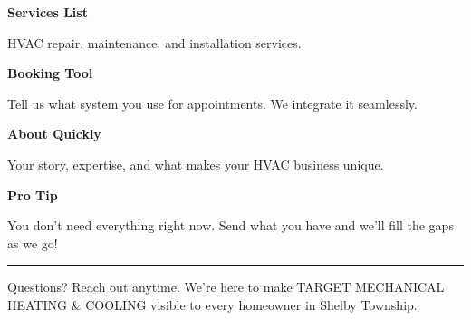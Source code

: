 \documentclass[11pt,letterpaper]{article}
\begin{document}
\begin{minipage}[t]{0.48\textwidth}
\begin{tcolorbox}[colframe=accent-teal, boxrule=1pt, left=0.7em, right=0.7em, top=0.5em, bottom=0.5em, arc=4pt, boxsep=0pt]
{\bfseries\small\color{accent-teal}Services List}

\vspace{0.15em}

{\small HVAC repair, maintenance, and installation services.}
\end{tcolorbox}

\vspace{0.1em}

\begin{tcolorbox}[colframe=accent-teal, boxrule=1pt, left=0.7em, right=0.7em, top=0.5em, bottom=0.5em, arc=4pt, boxsep=0pt]
{\bfseries\small\color{accent-teal}Booking Tool}

\vspace{0.15em}

{\small Tell us what system you use for appointments. We integrate it seamlessly.}
\end{tcolorbox}

\vspace{0.1em}

\begin{tcolorbox}[colframe=accent-teal, boxrule=1pt, left=0.7em, right=0.7em, top=0.5em, bottom=0.5em, arc=4pt, boxsep=0pt]
{\bfseries\small\color{accent-teal}About Quickly}

\vspace{0.15em}

{\small Your story, expertise, and what makes your HVAC business unique.}
\end{tcolorbox}

\vspace{-0.2em}
\end{minipage}

\vspace{0.15em}

\begin{tcolorbox}[colback={accent-red!5}, colframe=accent-red!20, boxrule=0.5pt, left=0.7em, right=0.7em, top=0.4em, bottom=0.4em, arc=6pt, boxsep=0pt]

{\bfseries\small\color{accent-red}Pro Tip}

\vspace{0.1em}

{\small You don't need everything right now. Send what you have and we'll fill the gaps as we go!}

\end{tcolorbox}

\vspace{0.15em}

\noindent\hrule
\vspace{0.2em}

{\small\color{text-light}Questions? Reach out anytime. We're here to make TARGET MECHANICAL HEATING \& COOLING visible to every homeowner in Shelby Township.}
\end{document}
